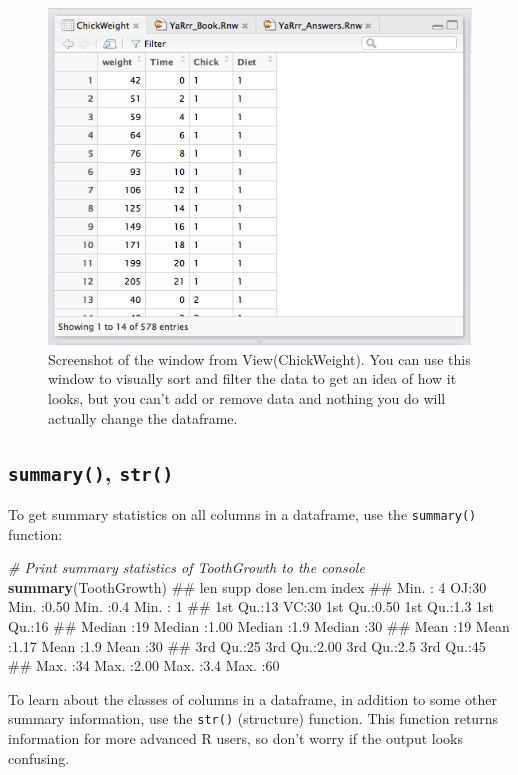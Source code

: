 \documentclass[]{book}
\newenvironment{Shaded}{\begin{snugshade}}{\end{snugshade}}
\newcommand{\KeywordTok}[1]{\textcolor[rgb]{0.13,0.29,0.53}{\textbf{#1}}}
\newcommand{\CommentTok}[1]{\textcolor[rgb]{0.56,0.35,0.01}{\textit{#1}}}
\newcommand{\NormalTok}[1]{#1}
\theoremstyle{definition}
\theoremstyle{definition}
\theoremstyle{remark}
\begin{document}
\begin{figure}

{\centering \includegraphics[width=0.5\linewidth]{images/chickweightscreenshot} 

}

\caption{Screenshot of the window from View(ChickWeight). You can use this window to visually sort and filter the data to get an idea of how it looks, but you can't add or remove data and nothing you do will actually change the dataframe.}\label{fig:viewchicks}
\end{figure}

\subsection{\texorpdfstring{\texttt{summary()},
\texttt{str()}}{summary(), str()}}\label{summary-str}

To get summary statistics on all columns in a dataframe, use the
\texttt{summary()} function:

\begin{Shaded}
\begin{Highlighting}[]
\CommentTok{# Print summary statistics of ToothGrowth to the console}
\KeywordTok{summary}\NormalTok{(ToothGrowth)}
\NormalTok{##       len     supp         dose          len.cm        index   }
\NormalTok{##  Min.   : 4   OJ:30   Min.   :0.50   Min.   :0.4   Min.   : 1  }
\NormalTok{##  1st Qu.:13   VC:30   1st Qu.:0.50   1st Qu.:1.3   1st Qu.:16  }
\NormalTok{##  Median :19           Median :1.00   Median :1.9   Median :30  }
\NormalTok{##  Mean   :19           Mean   :1.17   Mean   :1.9   Mean   :30  }
\NormalTok{##  3rd Qu.:25           3rd Qu.:2.00   3rd Qu.:2.5   3rd Qu.:45  }
\NormalTok{##  Max.   :34           Max.   :2.00   Max.   :3.4   Max.   :60}
\end{Highlighting}
\end{Shaded}

To learn about the classes of columns in a dataframe, in addition to
some other summary information, use the \texttt{str()} (structure)
function. This function returns information for more advanced R users,
so don't worry if the output looks confusing.
\end{document}
